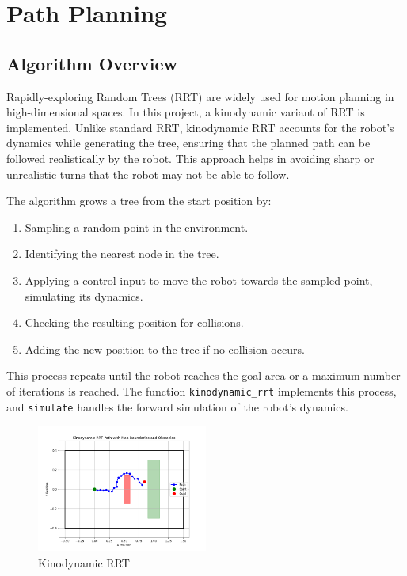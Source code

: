 \documentclass[12pt]{article}
\begin{document}
\section{Path Planning}

\subsection{Algorithm Overview}
Rapidly-exploring Random Trees (RRT) are widely used for motion planning in high-dimensional spaces. In this project, a kinodynamic variant of RRT is implemented. Unlike standard RRT, kinodynamic RRT accounts for the robot’s dynamics while generating the tree, ensuring that the planned path can be followed realistically by the robot. This approach helps in avoiding sharp or unrealistic turns that the robot may not be able to follow.

The algorithm grows a tree from the start position by:
\begin{enumerate}
    \item Sampling a random point in the environment.
    \item Identifying the nearest node in the tree.
    \item Applying a control input to move the robot towards the sampled point, simulating its dynamics.
    \item Checking the resulting position for collisions.
    \item Adding the new position to the tree if no collision occurs.
\end{enumerate}

This process repeats until the robot reaches the goal area or a maximum number of iterations is reached. The function \texttt{kinodynamic\_rrt} implements this process, and \texttt{simulate} handles the forward simulation of the robot’s dynamics.
    
\begin{figure}[h]
    \centering
      \includegraphics[width=0.5\textwidth]{./images/path.png}
      \caption{Kinodynamic RRT}
      \label{fig:sample_image}
    \end{figure}
    
\end{document}
